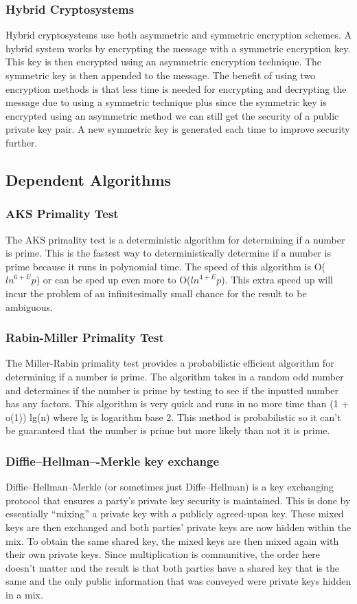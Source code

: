 \documentclass[conference]{IEEEtran}
\begin{document}
\subsubsection{Hybrid Cryptosystems}
Hybrid cryptosystems use both asymmetric and symmetric encryption schemes. A hybrid system works by encrypting the message with a symmetric encryption key. This key is then encrypted using an asymmetric encryption technique. The symmetric key is then appended to the message. The benefit of using two encryption methods is that less time is needed for encrypting and decrypting the message due to using a symmetric technique plus since the symmetric key is encrypted using an asymmetric method we can still get the security of a public private key pair. A new symmetric key is generated each time to improve security further.


\subsection{Dependent Algorithms}

\subsubsection{AKS Primality Test}
The AKS primality test is a deterministic algorithm for determining if a number is prime. This is the fastest way to deterministically determine if a number is prime because it runs in polynomial time. The speed of this algorithm is O(${ln}^{6 + E} p$) or can be sped up even more to O(${ln}^{4 + E} p$). This extra speed up will incur the problem of an infinitesimally small chance for the result to be ambiguous.

\subsubsection{Rabin-Miller Primality Test}
The Miller-Rabin primality test provides a probabilistic efficient algorithm for determining if a number is prime. The algorithm takes in a random odd number and determines if the number is prime by testing to see if the inputted number has any factors. This algorithm is very quick and runs in no more time than (1 + o(1)) lg(n) where lg is logarithm base 2. This method is probabilistic so it can't be guaranteed that the number is prime but more likely than not it is prime.

\subsubsection{Diffie--Hellman–-Merkle key exchange}
Diffie--Hellman--Merkle (or sometimes just Diffe--Hellman) is a key exchanging protocol that ensures a party's private key security is maintained. This is done by essentially ``mixing'' a private key with a publicly agreed-upon key. These mixed keys are then exchanged and both parties' private keys are now hidden within the mix. To obtain the same shared key, the mixed keys are then mixed again with their own private keys. Since multiplication is communitive, the order here doesn't matter and the result is that both parties have a shared key that is the same and the only public information that was conveyed were private keys hidden in a mix.
\color{red}
\end{document}
